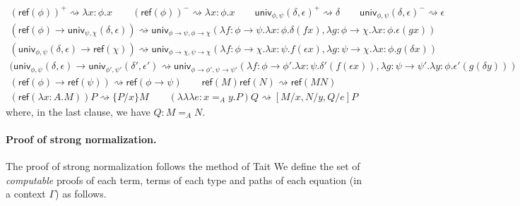 \documentclass{easychair}
\newcommand{\univ}[4]{\mathsf{univ}_{{#1},{#2}} \left( {#3} , {#4} \right)}
\newcommand{\triplelambda}{\lambda \!\! \lambda \!\! \lambda}
\newcommand{\reff}[1]{\mathsf{ref} \left( {#1} \right)}
\begin{document}
\begin{gather*}
(\reff{\phi})^+ \rightsquigarrow \lambda x : \phi . x
\qquad
(\reff{\phi})^- \rightsquigarrow \lambda x : \phi . x
\qquad
\univ{\phi}{\psi}{\delta}{\epsilon}^+ \rightsquigarrow \delta
\qquad
\univ{\phi}{\psi}{\delta}{\epsilon}^- \rightsquigarrow \epsilon
\\
(\reff \phi \rightarrow \univ{\psi}{\chi}{\delta}{\epsilon}) \rightsquigarrow \univ{\phi \rightarrow \psi}{\phi \rightarrow \chi}{\lambda f : \phi \rightarrow \psi . \lambda x : \phi . \delta (f x)}{\lambda g : \phi \rightarrow \chi . \lambda x : \phi . \epsilon (g x)}
\\
(\univ{\phi}{\psi}{\delta}{\epsilon} \rightarrow \reff{\chi}) \rightsquigarrow \univ{\phi \rightarrow \chi}{\psi \rightarrow \chi}{\lambda f : \phi \rightarrow \chi. \lambda x : \psi . f (\epsilon x)}{\lambda g : \psi \rightarrow \chi . \lambda x : \phi . g (\delta x)}
\\
(\univ{\phi}{\psi}{\delta}{\epsilon} \rightarrow \univ{\phi'}{\psi'}{\delta'}{\epsilon'} \rightsquigarrow \univ{\phi \rightarrow \phi'}{\psi \rightarrow \psi'}
{\lambda f : \phi \rightarrow \phi' . \lambda x : \psi . \delta' (f (\epsilon x))}{\lambda g : \psi \rightarrow \psi' . \lambda y : \phi . \epsilon' (g (\delta y))}
\\
(\reff{\phi} \rightarrow \reff{\psi}) \rightsquigarrow \reff{\phi \rightarrow \psi}
\qquad
\reff{M} \reff{N} \rightsquigarrow \reff{MN}
\\
(\reff{\lambda x:A.M})P \rightsquigarrow \{ P / x \} M
\qquad
(\triplelambda e : x =_A y.P)Q \rightsquigarrow [M/x, N/y, Q/e]P
\end{gather*}
where, in the last clause, we have $Q : M =_A N$.

\paragraph{Proof of strong normalization.}

The proof of strong normalization follows the method of Tait \cite{Tait1967}
We define the set of \emph{computable} proofs of each term, terms of each type
and paths of each equation (in a context $\Gamma$) as follows.
\end{document}
